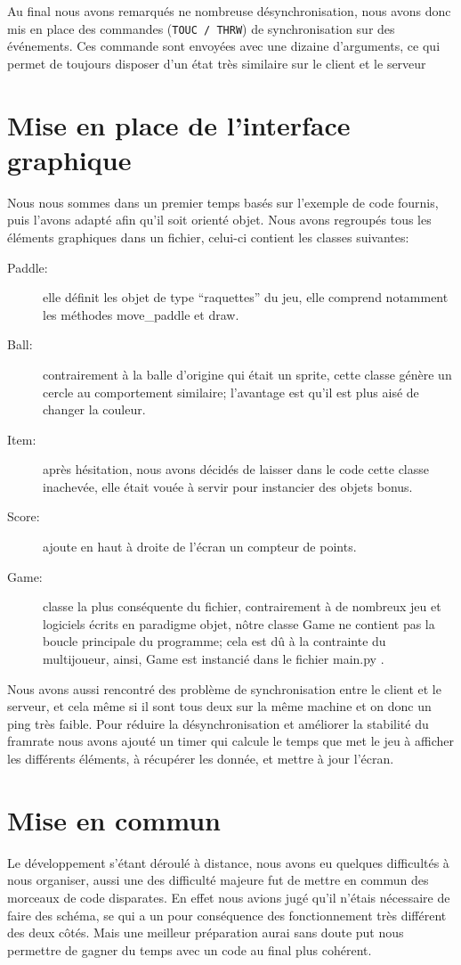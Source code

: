 \documentclass[12pt]{report}
\begin{document}
Au final nous avons remarqués ne nombreuse désynchronisation, nous avons donc
mis en place des commandes (\texttt{TOUC / THRW}) de synchronisation sur des
événements.
Ces commande sont envoyées avec une dizaine d’arguments, ce qui permet de toujours
disposer d'un état très similaire sur le client et le serveur

\chapter{Mise en place de l'interface graphique}
Nous nous sommes dans un premier temps basés sur l'exemple de code
fournis, puis l'avons adapté afin qu'il soit orienté objet. Nous avons
regroupés tous les éléments graphiques dans un fichier, celui-ci
contient les classes suivantes:

\begin{description}
  \item [Paddle:] elle définit les objet de type ``raquettes'' du jeu, elle
    comprend notamment les méthodes move\_paddle et draw.
  \item [Ball:] contrairement à la balle d'origine qui était un
    sprite, cette classe génère un cercle au comportement similaire;
    l'avantage est qu'il est plus aisé de changer la couleur.
  \item [Item: ] après hésitation, nous avons décidés de laisser dans
    le code cette classe inachevée, elle était vouée à servir pour
    instancier des objets bonus.
  \item [Score: ] ajoute en haut à droite de l'écran un compteur de
    points.
  \item [Game: ] classe la plus conséquente du fichier,
    contrairement à de nombreux jeu et logiciels écrits en paradigme
    objet, nôtre classe Game ne contient pas la boucle principale du
    programme; cela est dû à la contrainte du multijoueur, ainsi, Game
    est instancié dans le fichier main.py .
\end{description}

Nous avons aussi rencontré des problème de synchronisation entre le client
et le serveur, et cela même si il sont tous deux sur la même machine et on
donc un ping très faible.
Pour réduire la désynchronisation et améliorer la stabilité du framrate
nous avons ajouté un timer qui calcule le temps que met le jeu à afficher
les différents éléments, à récupérer les donnée, et mettre à jour l'écran.

\chapter{Mise en commun}
Le développement s'étant déroulé à distance, nous avons eu quelques
difficultés à nous organiser, aussi une des difficulté majeure fut de
mettre en commun des morceaux de code disparates.
En effet nous avions jugé qu'il n'étais nécessaire de faire des
schéma, se qui a un pour conséquence des fonctionnement très différent
des deux côtés.
Mais une meilleur préparation aurai sans doute put nous
permettre de gagner du temps avec un code au final plus cohérent.
\end{document}
